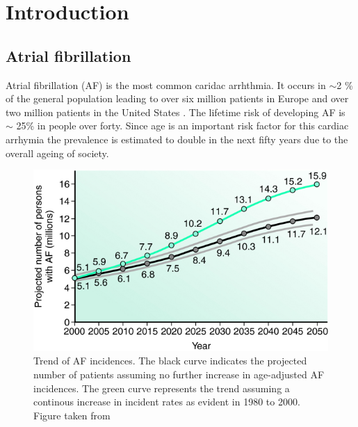 \documentclass[type=dr, dr=rernat, accentcolor=tud7b,colorbacktitle, bigchapter, openright, twoside, 12pt ]{tudthesis}
\begin{document}
\author{MSc Anna Maria Constantinescu}
\date{\today}
\dateofexam{}{}
\makethesistitle



\tableofcontents

\chapter{Introduction}


\newpage

\section{Atrial fibrillation}

Atrial fibrillation (AF) is the most common caridac arrhthmia. It occurs in $\sim$2 \% of the general population leading to over six million 
patients in Europe \cite{ESC10} and over two million patients in the United States \cite{CE09}. The lifetime risk of developing AF is 
$\sim$ 25\% in people over forty. Since age is an important risk factor for this cardiac arrhymia the prevalence is estimated to double in 
the next fifty years due to the overall ageing of society.\newline

\begin{figure}[H]
\begin{center}
\includegraphics[scale=3]{af_incidences_us.png}
\caption{Trend of AF incidences. The black curve indicates the projected number of patients assuming no further increase in age-adjusted AF 
incidences. The green curve represents the trend assuming a continous increase in incident rates as evident in 1980 to 2000. Figure taken 
from \cite{Miy06}}
\label{USincidences}
\end{center}
\end{figure}
\end{document}
